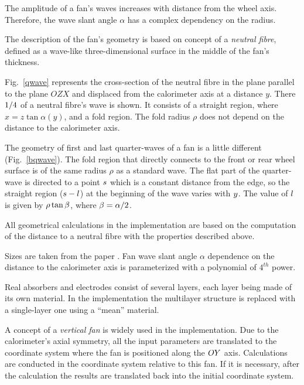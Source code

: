 \documentclass{article}
\begin{document}
The amplitude of a fan's waves increases with distance from the wheel axis.
Therefore, the wave slant angle $\alpha$ has a complex dependency on the radius.



The description of the fan's geometry is based on concept of a {\em neutral
fibre}, defined as a wave-like three-dimensional surface in the middle
of the fan's thickness.

Fig.~\ref{qwave} represents the cross-section of the neutral fibre in the
plane parallel to the plane $OZX$ and displaced from the calorimeter axis
at a distance $y$. There $1/4\/$ of a neutral fibre's wave is shown.
It consists of a straight region, where $x = z \tan \alpha(y)$, and a fold
region. The fold radius $\rho$ does not depend on the distance to the
calorimeter axis.



The geometry of first and last quarter-waves of a fan is a little different
(Fig.~\ref{bqwave}). The fold region that directly connects to the front or rear
wheel surface is of the same radius $\rho$ as a standard wave.
The flat part of the quarter-wave is directed to a point $s\/$ which
is a constant distance from the edge,
so the straight region ($s - l\/$) at the
beginning of the wave varies with $y\/$. The value of $l\/$ is given
by $\rho \tan \beta\/$, where $\beta = \alpha / 2\/$.

All geometrical calculations in the implementation are based on the
computation of the distance to a neutral fibre with the properties described
above.

Sizes are taken from the paper
\cite{geom_tables}. Fan wave slant angle $\alpha$ dependence
on the distance to the calorimeter axis is parameterized with a
polynomial of $4^{th}$ power.

Real absorbers and electrodes consist of several layers, each
layer being made of its own material. In the implementation the multilayer
structure is replaced with a single-layer one using a ``mean'' material.

A concept of a {\em vertical fan} is widely used in the implementation.
Due to the calorimeter's axial symmetry, all the input parameters are
translated to the coordinate system where the fan is positioned along
the $OY\/$ axis. Calculations are conducted in the
coordinate system relative to this fan. If it is
necessary, after the calculation the results are translated back into
the initial coordinate system.
\end{document}
